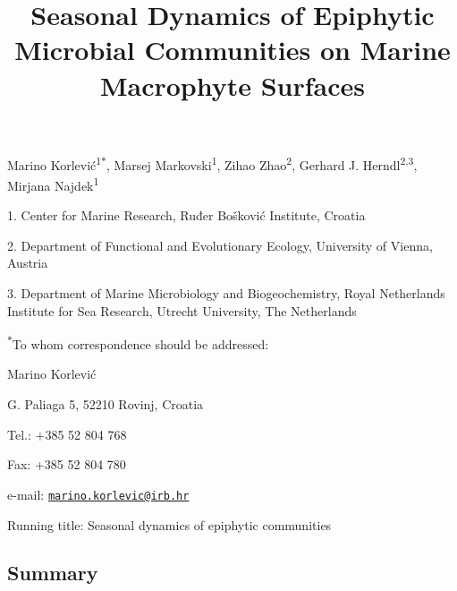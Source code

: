 \documentclass[12pt,]{article}
\title{\textbf{Seasonal Dynamics of Epiphytic Microbial Communities on Marine
Macrophyte Surfaces}}
\author{}
\date{}
\begin{document}
\maketitle

\vspace{20mm}

Marino Korlević\textsuperscript{1\(*\)}, Marsej
Markovski\textsuperscript{1}, Zihao Zhao\textsuperscript{2}, Gerhard J.
Herndl\textsuperscript{2,3}, Mirjana Najdek\textsuperscript{1}

1. Center for Marine Research, Ruđer Bošković Institute, Croatia

2. Department of Functional and Evolutionary Ecology, University of
Vienna, Austria

3. Department of Marine Microbiology and Biogeochemistry, Royal
Netherlands Institute for Sea Research, Utrecht University, The
Netherlands

\textsuperscript{\(*\)}To whom correspondence should be addressed:

Marino Korlević

G. Paliaga 5, 52210 Rovinj, Croatia

Tel.: +385 52 804 768

Fax: +385 52 804 780

e-mail:
\href{mailto:marino.korlevic@irb.hr}{\nolinkurl{marino.korlevic@irb.hr}}

Running title: Seasonal dynamics of epiphytic communities

\newpage
\linenumbers
{}
\setlength\parindent{24pt}

\hypertarget{summary}{%
\subsection{Summary}\label{summary}}
\end{document}
